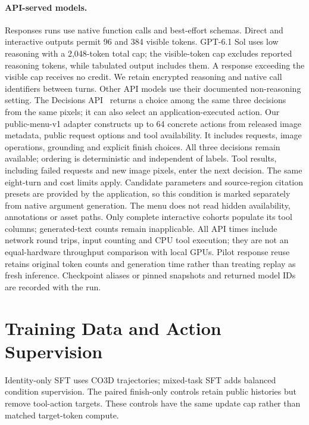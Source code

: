 \paragraph{API-served models.}
Responses runs use native function calls and best-effort schemas. Direct and interactive outputs permit 96 and 384 visible tokens. GPT-6.1 Sol uses low reasoning with a 2,048-token total cap; the visible-token cap excludes reported reasoning tokens, while tabulated output includes them. A response exceeding the visible cap receives no credit. We retain encrypted reasoning and native call identifiers between turns. Other API models use their documented non-reasoning setting. The Decisions API~\cite{openai_decisions} returns a choice among the same three decisions from the same pixels; it can also select an application-executed action. Our public-menu-v1 adapter constructs up to 64 concrete actions from released image metadata, public request options and tool availability. It includes requests, image operations, grounding and explicit finish choices. All three decisions remain available; ordering is deterministic and independent of labels. Tool results, including failed requests and new image pixels, enter the next decision. The same eight-turn and cost limits apply. Candidate parameters and source-region citation presets are provided by the application, so this condition is marked separately from native argument generation. The menu does not read hidden availability, annotations or asset paths. Only complete interactive cohorts populate its tool columns; generated-text counts remain inapplicable. All API times include network round trips, input counting and CPU tool execution; they are not an equal-hardware throughput comparison with local GPUs. Pilot response reuse retains original token counts and generation time rather than treating replay as fresh inference. Checkpoint aliases or pinned snapshots and returned model IDs are recorded with the run.


\section{Training Data and Action Supervision}



Identity-only SFT uses CO3D trajectories; mixed-task SFT adds balanced condition supervision. The paired finish-only controls retain public histories but remove tool-action targets. These controls have the same update cap rather than matched target-token compute.

